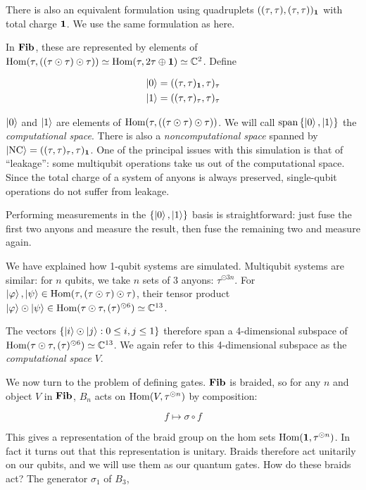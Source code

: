 There is also an equivalent formulation using quadruplets
$((\tau,\tau),(\tau,\tau))_{\mathbf{1}}$ with total charge $\mathbf{1}$. We use the same
formulation as \cite{Hormozi2007} here.

In $\mathbf{Fib}$, these are represented by elements of $\operatorname{Hom}(\tau, ((\tau \odot
\tau)\odot \tau)) \simeq \operatorname{Hom}(\tau, 2\tau \oplus \mathbf{1}) \simeq \mathbb{C}^2$. 
Define 

\begin{align}
\left|0\right> = ((\tau,\tau)_{\mathbf{1}} , \tau)_\tau \\
\left|1\right> = ((\tau,\tau)_\tau , \tau)_\tau 
\end{align}

$\left|0\right>$ and $\left|1\right>$ are elements of $\operatorname{Hom}(\tau, ((\tau \odot \tau)\odot
\tau))$. We will call $\operatorname{span}\left\{ \left|0\right>, \left|1\right> \right\}$
the \emph{computational space}. There is also a \emph{noncomputational space}
spanned by $\left|\text{NC}\right> = ((\tau,\tau)_\tau,
\tau)_{\mathbf{1}}$. One of the principal issues with this simulation is that of
``leakage'': some multiqubit operations take us out of the computational space. 
Since the total charge of a system of anyons is always preserved, single-qubit
operations do not suffer from leakage.

Performing measurements in the $\left\{ \left|0\right>, \left|1\right> \right\}$ basis is
straightforward: just fuse the first two anyons and measure the result, then
fuse the remaining two and measure again.

We have explained how 1-qubit systems are simulated. Multiqubit systems are
similar: for $n$ qubits, we take $n$ sets of $3$ anyons: $\tau^{\odot 3n}$.
For $\left|\varphi\right>,\left|\psi\right>\in \operatorname{Hom}(\tau,(\tau \odot \tau) \odot \tau)$,
their tensor product $\left|\varphi\right> \odot \left|\psi\right> \in \operatorname{Hom}(\tau \odot
\tau, (\tau)^{\odot 6}) \simeq \mathbb{C}^{13}$. 

The vectors $\left\{ \left|i\right>\odot \left|j\right> : 0 \leq i,j\leq 1 \right\}$
therefore span a 4-dimensional subspace of $\operatorname{Hom}(\tau \odot \tau, (\tau)^{\odot
6}) \simeq \mathbb{C}^{13}$. We again refer to this 4-dimensional subspace as the
\emph{computational space} $V$. 

We now turn to the problem of defining gates. $\mathbf{Fib}$ is braided, so for any $n$
and object $V$ in $\mathbf{Fib}$, $B_n$ acts on $\operatorname{Hom}(V, \tau^{\odot n})$ by
composition: 

\begin{equation}
f \mapsto \sigma \circ f
\end{equation}

This gives a representation of the braid group on the hom sets $\operatorname{Hom}(\mathbf{1},
\tau^{\odot n})$.  In fact it turns out that this representation is unitary.
Braids therefore act unitarily on our qubits, and we will use them as our
quantum gates. How do these braids act? The generator $\sigma_1$ of $B_3$,

